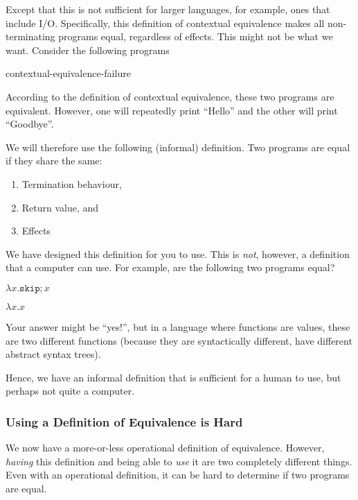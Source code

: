 Except that this is not sufficient for larger languages, for example, ones that include I/O. Specifically, this definition of contextual equivalence makes all non-terminating programs equal, regardless of effects. This might not be what we want. Consider the following programs

\begin{center}
    {contextual-equivalence-failure}
\end{center}

According to the definition of contextual equivalence, these two programs are equivalent. However, one will repeatedly print ``Hello'' and the other will print ``Goodbye''. 

We will therefore use the following (informal) definition. Two programs are equal if they share the same: 
\begin{enumerate}
    \item Termination behaviour,
    \item Return value, and
    \item Effects
\end{enumerate}

We have designed this definition for you to use. This is \textit{not}, however, a definition that a computer can use. For example, are the following two programs equal?

\begin{minipage}[t]{0.5\textwidth}
\centering
$\lambda x. \texttt{skip}; x$
\end{minipage}%
\begin{minipage}[t]{0.5\textwidth}
\centering
$\lambda x. x$
\end{minipage}

Your answer might be ``yes!'', but in a language where functions are values, these are two different functions (because they are syntactically different, have different abstract syntax trees). 

Hence, we have an informal definition that is sufficient for a human to use, but perhaps not quite a computer. 

\subsubsection{Using a Definition of Equivalence is Hard}
We now have a more-or-less operational definition of equivalence. However, \textit{having} this definition and being able to \textit{use} it are two completely different things. Even with an operational definition, it can be hard to determine if two programs are equal.

